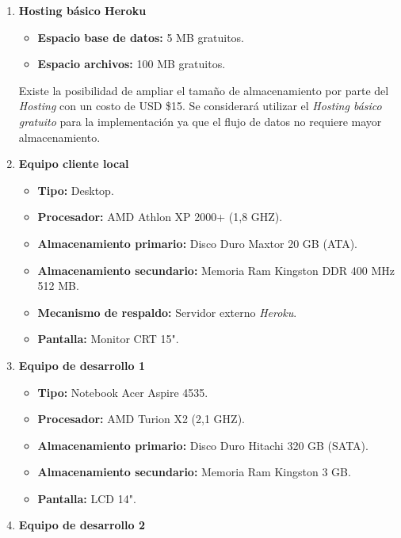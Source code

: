 \documentclass[letterpaper,12pt]{article}
\begin{document}
\begin{enumerate}

\item \textbf{Hosting básico Heroku}

\begin{itemize}
\item \textbf{Espacio base de datos:}
5 MB gratuitos.
\item \textbf{Espacio archivos:}
100 MB gratuitos.
\end{itemize}

Existe la posibilidad de ampliar el tamaño de almacenamiento por parte del \emph{Hosting} con un costo de 
USD \$15. Se considerará utilizar el \emph{Hosting básico gratuito} para la implementación ya que el flujo de datos 
no requiere mayor almacenamiento. 

\item \textbf{Equipo cliente local}

\begin{itemize}

\item \textbf{Tipo: }
Desktop.
\item \textbf{Procesador: }
AMD Athlon XP 2000+ (1,8 GHZ).
\item \textbf{Almacenamiento primario: }
Disco Duro Maxtor 20 GB (ATA).
\item \textbf{Almacenamiento secundario: }
Memoria Ram Kingston DDR 400 MHz 512 MB.
\item \textbf{Mecanismo de respaldo: }
Servidor externo \emph{Heroku}.
\item \textbf{Pantalla: }
Monitor CRT 15".
\end{itemize}

\newpage

\item \textbf{Equipo de desarrollo 1}

\begin{itemize}
\item \textbf{Tipo: }
Notebook Acer Aspire 4535.
\item \textbf{Procesador: }
AMD Turion X2 (2,1 GHZ).
\item \textbf{Almacenamiento primario: }
Disco Duro Hitachi 320 GB (SATA).
\item \textbf{Almacenamiento secundario: }
Memoria Ram Kingston 3 GB.
\item \textbf{Pantalla: }
LCD 14".
\end{itemize}

\item \textbf{Equipo de desarrollo 2}


\end{enumerate}
\end{document}
